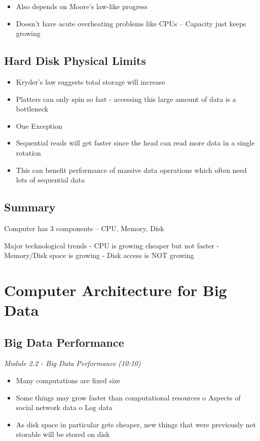 \documentclass[
]{book}
\providecommand{\tightlist}{%
  \setlength{\itemsep}{0pt}\setlength{\parskip}{0pt}}
\begin{document}
\begin{itemize}
\tightlist
\item
  Also depends on Moore's law-like progress
\item
  Doesn't have acute overheating problems like CPUs -- Capacity just keeps growing
\end{itemize}

\subsection{Hard Disk Physical Limits}\label{hard-disk-physical-limits}

\begin{itemize}
\tightlist
\item
  Kryder's law suggests total storage will increase
\item
  Platters can only spin so fast - accessing this large amount of data is a bottleneck
\item
  One Exception
\item
  Sequential reads will get faster since the head can read more data in a single rotation
\item
  This can benefit performance of massive data operations which often need lots of sequential data
\end{itemize}

\subsection{Summary}\label{summary-1}

Computer has 3 components -- CPU, Memory, Disk

Major technological trends
- CPU is growing cheaper but not faster
- Memory/Disk space is growing
- Disk access is NOT growing

\section{Computer Architecture for Big Data}\label{computer-architecture-for-big-data}

\subsection{Big Data Performance}\label{big-data-performance}

\emph{Module 2.2 - Big Data Performance (10:10)}

\begin{itemize}
\tightlist
\item
  Many computations are fixed size
\item
  Some things may grow faster than computational resources
  o Aspects of social network data
  o Log data
\item
  As disk space in particular gets cheaper, new things that were previously not storable will be stored on disk
\end{itemize}
\end{document}

